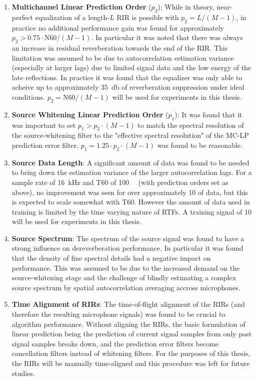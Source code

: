\begin{enumerate}
	\item \textbf{Multichannel Linear Prediction Order} ($p_2$): While in theory, near-perfect equalization of a length-$L$ RIR is possible with $p_2 = L / \left(M-1\right)$, in practice no additional performance gain was found for approximately $p_2 > 0.75 \cdot \mathrm{N60} / \left(M-1\right)$. In particular it was noted that there was always an increase in residual reverberation towards the end of the RIR. This limitation was assumed to be due to autocorrelation estimation variance (especially at larger lags) due to limited signal data and the low energy of the late reflections. In practice it was found that the equalizer was only able to acheive up to approximately \qty{35}{\decibel} of reverberation suppression under ideal conditions. $p_2=\mathrm{N60}/\left(M-1\right)$ will be used for experiments in this thesis. 
	\item \textbf{Source Whitening Linear Prediction Order} ($p_1$): It was found that it was important to set $p_1 > p_2 \cdot \left(M-1\right)$ to match the spectral resolution of the source-whitening filter to the "effective spectral resolution" of the MC-LP prediction error filter. $p_1 = 1.25 \cdot p_2 \cdot \left(M-1\right)$ was found to be reasonable.
	\item \textbf{Source Data Length}: A significant amount of data was found to be needed to bring down the estimation variance of the larger autocorrelation lags. For a sample rate of \qty{16}{\kilo\hertz} and T60 of \qty{100}{\milli\sec} (with prediction orders set as above), no improvement was seen for over approximately \qty{10}{\sec} of data, but this is expected to scale somewhat with T60. However the amount of data used in training is limited by the time varying nature of RTFs. A training signal of \qty{10}{\sec} will be used for experiments in this thesis.
	\item \textbf{Source Spectrum}: The spectrum of the source signal was found to have a strong influence on dereverberation performance. In particular it was found that the density of fine spectral details had a negative impact on performance. This was assumed to be due to the increased demand on the source-whitening stage and the challenge of blindly estimating a complex source spectrum by spatial autocorrelation averaging accross microphones.
	\item \textbf{Time Alignment of RIRs}: The time-of-flight alignment of the RIRs (and therefore the resulting microphone signals) was found to be crucial to algorithm performance. Without aligning the RIRs, the basic formulation of linear prediction being the prediction of current signal samples from only past signal samples breaks down, and the prediction error filters become cancellation filters instead of whitening filters. For the purposes of this thesis, the RIRs will be manually time-aligned and this procedure was left for future studies.

\end{enumerate}
